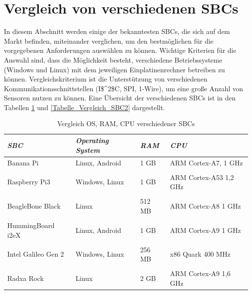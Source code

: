 \section{Vergleich von verschiedenen SBCs}
\label{section_Vergleich_SBC}
In diesem Abschnitt werden einige der bekanntesten \acp{SBC}, die sich auf dem Markt befinden, miteinander verglichen, um den bestmöglichen für die vorgegebenen Anforderungen auswählen zu können.
Wichtige Kriterien für die Auswahl sind, dass die Möglichkeit besteht, verschiedene Betriebssysteme (Windows und Linux) mit dem jeweiligen Einplatinenrechner betreiben zu können. Vergleichskriterium ist die Unterstützung von verschiedenen Kommunikationsschnittstellen (\ac{I$^2$C}, \ac{SPI}, 1-Wire), um eine große Anzahl von Sensoren nutzen zu können. Eine Übersicht der verschiedenen \acp{SBC} ist in den Tabellen \ref{Tabelle_Vergleich_SBC1} und \ref{Tabelle_Vergleich_SBC2} dargestellt.

\begin{table}[H]
\centering
\begin{tabular}{
llll
}
\toprule
\multicolumn{1}{p{3cm}}{\textit{\ac{SBC}}} & \multicolumn{1}{p{3.5cm}}{\textit{Operating System} } & \multicolumn{1}{p{1,5cm}}{\textit{RAM} }&\multicolumn{1}{p{3cm}}{ \centering\textit{CPU} }\\\midrule
Banana Pi & Linux, Android & 1 GB & ARM Cortex-A7, 1 GHz\\
&&&\\
Raspberry Pi3&Windows, Linux&1 GB&ARM Cortex-A53 1,2 GHz\\
&&&\\
BeagleBone Black & Linux & 512 MB & ARM Cortex-A8 1 GHz\\
&&&\\
HummingBoard i2eX & Linux, Android & 1 GB & ARM Cortex-A9 1 GHz\\
&&&\\
Intel Galileo Gen 2 & Windows, Linux & 256 MB & x86 Quark 400 MHz\\
&&&\\
Radxa Rock & Linux & 2 GB & ARM Cortex-A9 1,6 GHz\\
\bottomrule
\end{tabular}
\caption{Vergleich OS, RAM, CPU verschiedener SBCs \citep{Quelle_Tabelle} \citep{RaspberryPiHomePage}}
\label{Tabelle_Vergleich_SBC1}
\end{table}

